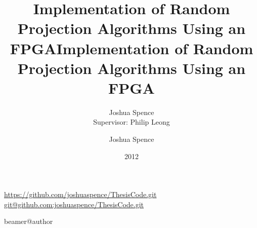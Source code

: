 \usepackage{definevariable} %
\usepackage{persons} %


\uosAssessment{}{\thesis}

\urldef{\gitRepoHTTP}\url{https://github.com/joshuaspence/ThesisCode.git}
\urldef{\gitRepoSSH}\url{git@github.com:joshuaspence/ThesisCode.git}


\newcommand*\pdfmetadata{%
    pdfauthor={Joshua Spence},
    pdftitle={Implementation of Random Projection Algorithms Using an FPGA},
    pdfsubject={},
    pdfkeywords={commute time,anomaly detection,FPGA},
    pdfdisplaydoctitle={true}
}

\newcommand\IntelXeon{Intel\textsuperscript{\textregistered} Xeon\textsuperscript{\textregistered}}
\newcommand\IntelCoreiSeven{Intel\textsuperscript{\textregistered} Core\textsuperscript{\texttrademark} i7}
\newcommand\AutoESL{\software{Xilinx\textsuperscript{\textregistered} AutoESL}}
\newcommand\ModelSim{\software{Altera\textsuperscript{\textregistered} ModelSim}}
\newcommand\Xilinx{Xilinx\textsuperscript{\textregistered}}
\newcommand\ARM{ARM\textsuperscript{\textregistered}}
\newcommand\Cortex{Cortex\textsuperscript{\texttrademark}}

\ifcsname beamer@author\endcsname
    \title[Random Projection Algorithms Using an FPGA]{Implementation of Random Projection Algorithms Using an FPGA}
    \author[Joshua Spence]{Joshua Spence\\{\tiny{Supervisor: Philip Leong}}}
\else
    \title{Implementation of Random Projection Algorithms Using an FPGA}
    \author{Joshua Spence}
\fi

\date{2012}